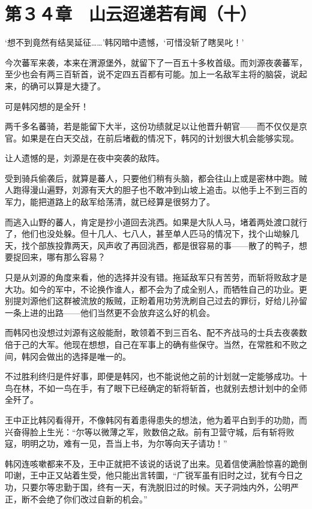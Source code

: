 \section{第３４章　山云迢递若有闻（十）}

‘想不到竟然有结吴延征……’韩冈暗中遗憾，‘可惜没斩了瞎吴叱！’

今次蕃军来袭，本来在渭源堡外，就留下了一百五十多枚首级。而刘源夜袭蕃军，至少也会有两三百斩首，说不定四五百都有可能。加上一名敌军主将的脑袋，说起来，的确可以算是大捷了。

可是韩冈想的是全歼！

两千多名蕃骑，若是能留下大半，这份功绩就足以让他晋升朝官——而不仅仅是京官。如果是在白天交战，在前后堵截的情况下，韩冈的计划很大机会能够实现。

让人遗憾的是，刘源是在夜中突袭的敌阵。

受到骑兵偷袭后，就算是蕃人，只要他们稍有头脑，都会往山上或是密林中跑。贼人跑得漫山遍野，刘源有天大的胆子也不敢冲到山坡上追击。以他手上不到三百的军力，能把道路上的敌军给荡清，就已经算是很努力了。

而逃入山野的蕃人，肯定是抄小道回去洮西。如果是大队人马，堵着两处渡口就行了，他们也没处躲。但十几人、七八人，甚至单人匹马的情况下，找个山坳躲几天，找个部族投靠两天，风声收了再回洮西，都是很容易的事——散了的鸭子，想要捉回来，哪有那么容易？

只是从刘源的角度来看，他的选择并没有错。拖延敌军只有苦劳，而斩将败敌才是大功。如今的军中，不论换作谁人，都不会为了成全别人，而牺牲自己的功业。更别提刘源他们这群被流放的叛贼，正盼着用功劳洗刷自己过去的罪衍，好给儿孙留一条上进的出路——他们当然更不会放弃这么好的机会。

而韩冈也没想过刘源有这般能耐，敢领着不到三百名、配不齐战马的士兵去夜袭数倍于己的大军。他现在想想，自己在军事上的确有些保守。当然，在常胜和不败之间，韩冈会做出的选择是唯一的。

不过胜利终归是件好事，即便是韩冈，也不能说他之前的计划就一定能够成功。十鸟在林，不如一鸟在手，有了眼下已经确定的斩将斩首，也就别去想计划中的全师全歼了。

王中正比韩冈看得开，不像韩冈有着患得患失的想法，他为着平白到手的功勋，而兴奋得脸上生光：“尔等以微薄之军，败数倍之敌。前有卫营守城，后有斩将败寇，明明之功，难有一见，吾当上书，为尔等向天子请功！”

韩冈连咳嗽都来不及，王中正就把不该说的话说了出来。见着信使满脸惊喜的跪倒叩谢，王中正又站着生受，他只能出言转圜，“广锐军虽有旧时之过，犹有今日之功，只要尔等忠勤于国，终有一天，有洗脱旧过的时候。天子洞烛内外，公明严正，断不会绝了你们改过自新的机会。”

